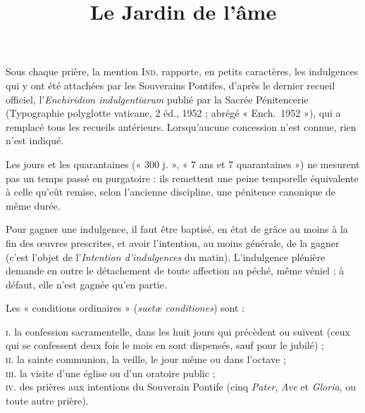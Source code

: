\documentclass{bibliotheca-missel}
\title{Le Jardin de l’âme}
\begin{document}
\frontmatter
\faussetitre
\frontispice
\pagedetitre

\thispagestyle{empty}
{\raggedright\fleuronpetit{}\vspace{1mm}{\color{rubrique}\rule{12mm}{0.4pt}}\par}\vspace{3mm}
\begin{notice}
Sous chaque prière, la mention \textsc{Ind.} rapporte, en petits caractères, les indulgences qui y ont été attachées par les Souverains Pontifes, d’après le dernier recueil officiel, l’\textit{Enchiridion indulgentiarum} publié par la Sacrée Pénitencerie (Typographie polyglotte vaticane, 2\ieme{} éd., 1952 ; abrégé « Ench.~1952 »), qui a remplacé tous les recueils antérieurs. Lorsqu’aucune concession n’est connue, rien n’est indiqué.

Les jours et les quarantaines (« 300 j. », « 7 ans et 7 quarantaines ») ne mesurent pas un temps passé en purgatoire : ils remettent une peine temporelle équivalente à celle qu’eût remise, selon l’ancienne discipline, une pénitence canonique de même durée.

Pour gagner une indulgence, il faut être baptisé, en état de grâce au moins à la fin des œuvres prescrites, et avoir l’intention, au moins générale, de la gagner (c’est l’objet de l’\textit{Intention d’indulgences} du matin). L’indulgence plénière demande en outre le détachement de toute affection au péché, même véniel ; à défaut, elle n’est gagnée qu’en partie.

Les « conditions ordinaires » (\textit{suetæ conditiones}) sont :

\noindent\hspace*{1em}\textsc{i.} la confession sacramentelle, dans les huit jours qui précèdent ou suivent (ceux qui se confessent deux fois le mois en sont dispensés, sauf pour le jubilé) ;\\
\hspace*{1em}\textsc{ii.} la sainte communion, la veille, le jour même ou dans l’octave ;\\
\hspace*{1em}\textsc{iii.} la visite d’une église ou d’un oratoire public ;\\
\hspace*{1em}\textsc{iv.} des prières aux intentions du Souverain Pontife (cinq \textit{Pater}, \textit{Ave} et \textit{Gloria}, ou toute autre prière).


\end{notice}
\end{document}
